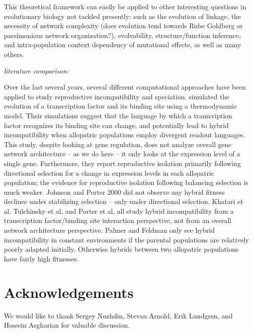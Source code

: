 \documentclass{article}
\newcommand{\plr}[1]{\todo[color=blue!25]{#1}}
\newcommand{\plr}[1]{{\color{blue}\it #1}}
\newcommand{\jss}[1]{{\color{olive}\it #1}}
\newcommand{\1}{\mathbbm{1}}
\begin{document}
This theoretical framework can easily be applied to other interesting questions in evolutionary biology not tackled presently: such as the evolution of linkage, the necessity of network complexity (does evolution tend towards Rube Goldberg or parsimonious network organization?), evolvability, structure/function inference, and intra-population context dependency of mutational effects, as well as many others.

\jss{literature comparison:}

Over the last several years, several different computational approaches have been applied to study reproductive incompatibility and speciation. \citet{tulchinsky} simulated the evolution of a transcription factor and its binding site using a thermodynamic model. Their simulations suggest that the language by which a transcription factor recognizes its binding site can change, and potentially lead to hybrid incompatibility when allopatric populations employ divergent readout languages. This study, despite looking at gene regulation, does not analyze overall gene network architecture -- as we do here -- it only looks at the expression level of a single gene. Furthermore, they report reproductive isolation primarily following directional selection for a change in expression levels in each allopatric population; the evidence for reproductive isolation following balancing selection is much weaker. Johnson and Porter 2000 did not observe any hybrid fitness declines under stabilizing selection -- only under directional selection. 
\plr{citations:}
Khatari et al, Tulchinsky et al, and Porter et al, all study hybrid incompatibility from a transcription factor/binding site interaction perspective, not from an overall network architecture perspective. Palmer and Feldman only see hybrid incompatibility in constant environments if the parental populations are relatively poorly adapted initially. Otherwise hybrids between two allopatric populations have fairly high fitnesses.  

\section*{Acknowledgements}
We would like to thank Sergey Nuzhdin, Stevan Arnold, Erik Lundgren, and Hossein Asgharian for valuable discussion.




\normalsize
\appendix
\end{document}
